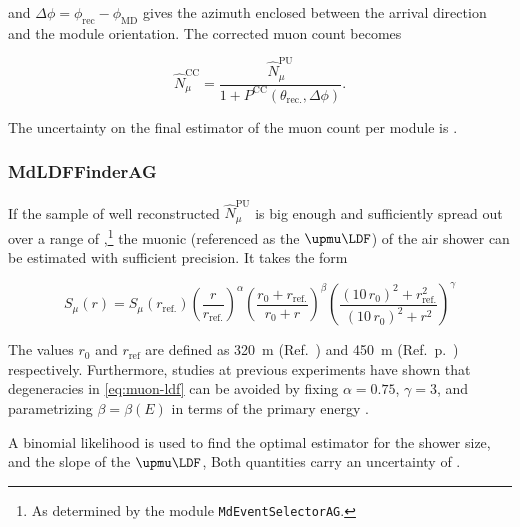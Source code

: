 and $\Delta\phi = \phi_\mathrm{rec} - \phi_\mathrm{MD}$ gives the azimuth
enclosed between the \EAS arrival direction and the \UMD module orientation. 
The corrected muon count becomes

\begin{equation}
	\label{eq:corner-clipping-correction}
	\hat{N}^\mathrm{CC}_\mu = \frac{\hat{N}^\mathrm{PU}_\mu}{1 + P^\mathrm{CC}(\theta_\mathrm{rec.}, \Delta\phi)}.
\end{equation}

The uncertainty on the final estimator of the muon count per module is 
.

\subsubsection{MdLDFFinderAG}
\label{sssec:umd-reconstruction-ldf}

If the sample of well reconstructed $\hat{N}^\mathrm{PU}_\mu$ is big enough and
sufficiently spread out over a range of \SPDs,\footnote{As determined by the
module \texttt{MdEventSelectorAG}.} the muonic \LDF (referenced as the 
$\upmu\LDF$) of the air shower can be estimated with sufficient precision. It
takes the form \cite{thepierreaugercollaborationOfficialOfflineRepository2025,
desouzaDirectMeasurementMuon2009}

\begin{equation}
\label{eq:muon-ldf}
S_\mu(r) = S_\mu(r_\mathrm{ref.}) \left(\frac{r}{r_\mathrm{ref.}}\right)^\alpha \left(\frac{r_0 + r_\mathrm{ref.}}{r_0 + r}\right)^\beta \left(\frac{(10\,r_0)^2 + r_\mathrm{ref.}^2}{(10\,r_0)^2 + r^2}\right)^\gamma
\end{equation}

The values $r_0$ and $r_\mathrm{ref}$ are defined as \SI{320}{\meter} (Ref.\ 
\cite{jesusStudyMassComposition2025}) and \SI{450}{\meter} (Ref.\ p.\ 
\pageref{sssec:reconstruction-ldf-finder}) respectively. Furthermore, studies
at previous experiments  have shown that degeneracies in \cref{eq:muon-ldf} can
be avoided by fixing $\alpha=0.75$, $\gamma=3$, and parametrizing 
$\beta = \beta(E)$ in terms of the primary \CR energy 
\cite{desouzaDirectMeasurementMuon2009}.

A binomial likelihood is used to find the optimal estimator for the \UMD shower
size, and the slope of the $\upmu\LDF$, Both quantities carry an uncertainty of
\todo{find this out}.
